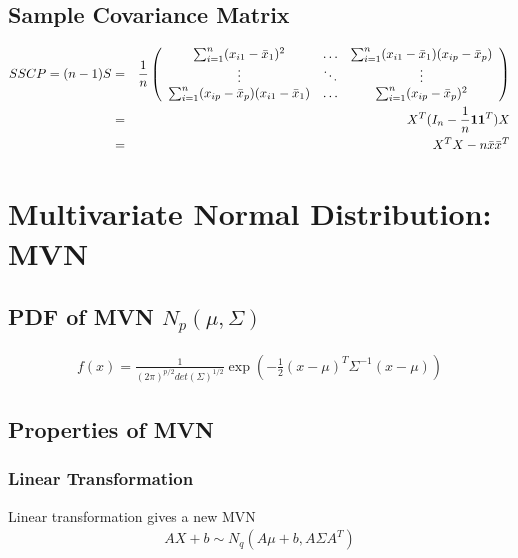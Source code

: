 \documentclass[12pt]{extarticle}
\newcommand{\<}{\langle}
\renewcommand{\>}{\rangle}
\theoremstyle{definition}
\begin{document}
\subsection{Sample Covariance Matrix}
\begin{eqnarray*}
SSCP = (n-1)S &=& \frac{1}{n}
    \left(\begin{array}{ccc}
      \sum^n_{i=1}(x_{i1}-\Bar{x}_1)^2 & \ldots & \sum^n_{i=1}(x_{i1}-\Bar{x}_1)(x_{ip}-\Bar{x}_p) \\
      \vdots & \ddots & \vdots \\
      \sum^n_{i=1}(x_{ip}-\Bar{x}_p)(x_{i1}-\Bar{x}_1) & \ldots & \sum^n_{i=1}(x_{ip}-\Bar{x}_p)^2
    \end{array} \right) \\
&=& X^T (I_n - \frac{1}{n} {\bf 11}^T) X \\
&=& X^T X -n \Bar{x} \Bar{x}^T
\end{eqnarray*}

\newpage
\section{Multivariate Normal Distribution: MVN}
\subsection{PDF of MVN $N_p(\mu, \Sigma)$}
\begin{eqnarray*}
f(x) = \frac{1}{(2\pi)^{p/2} det(\Sigma)^{1/2}} \exp\left(-\frac{1}{2} (x-\mu)^T \Sigma^{-1} (x-\mu)\right)
\end{eqnarray*}

\subsection{Properties of MVN}
\subsubsection{Linear Transformation} 
Linear transformation gives a new MVN
\begin{eqnarray*}
AX+b \sim N_q(A\mu + b, A\Sigma A^T)
\end{eqnarray*}
\end{document}
